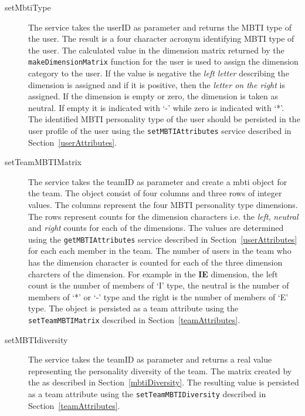 \begin{description}

\item[setMbtiType] The service takes the userID as parameter and returns the MBTI type of the user. The result is a four character acronym identifying MBTI type of the user. The calculated value in the dimension matrix returned by the \texttt{makeDimensionMatrix} function for the user is used to assign the dimension category to the user. If the value is negative the \textit{left letter} describing the dimension is assigned and if it is positive, then the \textit{letter on the right} is assigned. If the dimension is empty or zero, the dimension is taken as neutral. If empty it is indicated with `-' while zero is indicated with `*'.  The identified MBTI personality type of the user should be persisted in the user profile of the user using the \texttt{setMBTIAttributes} service described in Section~\ref{userAttributes}.

\item[setTeamMBTIMatrix] The service takes the teamID as parameter and create a mbti object for the team. The object consist of four columns and three rows of integer values. The columns represent the four MBTI personality type dimensions. The rows represent counts for the dimension characters  i.e. the \textit{left}, \textit{neutral} and \textit{right} counts for each of the dimensions. The values are determined using the \texttt{getMBTIAttributes} service described in Section~\ref{userAttributes} for each each member in the team. The number of users in the team who has the dimension character is counted for each of the three dimension charcters of the dimension. For example in the \textbf{IE} dimension, the left count is the number of members of `I' type, the neutral is the number of members of `*' or `-' type and the right is the number of members of `E' type. The object is persisted as a team attribute using the \texttt{setTeamMBTIMatrix} described in Section~\ref{teamAttributes}.

\item[setMBTIdiversity] The service takes the teamID as parameter and returns a real value representing the personality diversity of the team. The matrix created by the  as described in Section~\ref{mbtiDiversity}. The resulting value is persisted as a team attribute using the \texttt{setTeamMBTIDiversity} described in Section~\ref{teamAttributes}.
\end{description}  


